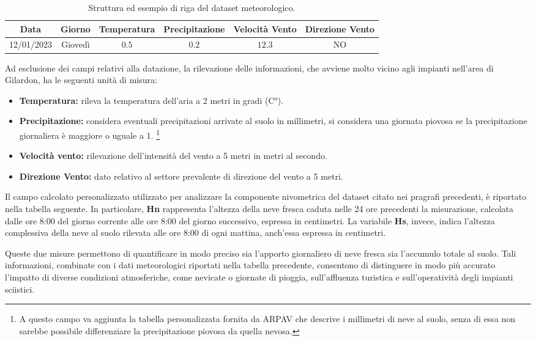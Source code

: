 \begin{table}[h]
    \centering
    \begin{tabular}{cccccc}
        \toprule
        \textbf{Data} & \textbf{Giorno} & \textbf{Temperatura}  & \textbf{Precipitazione} & \textbf{Velocità Vento} & \textbf{Direzione Vento} \\
        \midrule
        12/01/2023 & Giovedì &  $0.5$ & $0.2$ & $12.3$ & NO \\
        \bottomrule
    \end{tabular}
    \caption{Struttura ed esempio di riga del dataset meteorologico.}
    \label{tab:SpecificaMeteo}
\end{table}

Ad esclusione dei campi relativi alla datazione, la rilevazione delle informazioni, che avviene molto vicino agli impianti nell'area di Gilardon, ha le seguenti unità di misura:

\begin{itemize}
    \item \textbf{Temperatura:} rileva la temperatura dell'aria a 2 metri in gradi (C°).
    \item \textbf{Precipitazione:} considera eventuali precipitazioni arrivate al suolo in millimetri, si considera una giornata piovosa se la precipitazione giornaliera è maggiore o uguale a 1. \footnote{A questo campo va aggiunta la tabella personalizzata fornita da ARPAV che descrive i millimetri di neve al suolo, senza di essa non sarebbe possibile differenziare la precipitazione piovosa da quella nevosa.}
    \item \textbf{Velocità vento:} rilevazione dell'intensità del vento a 5 metri in metri al secondo.
    \item \textbf{Direzione Vento:} dato relativo al settore prevalente di direzione del vento a 5 metri.
\end{itemize}


Il campo calcolato personalizzato utilizzato per analizzare la componente nivometrica del dataset citato nei pragrafi precedenti,  è riportato nella tabella seguente. 
In particolare, \textbf{Hn} rappresenta l'altezza della neve fresca caduta nelle 24 ore precedenti la misurazione, calcolata dalle ore 8:00 del giorno corrente alle ore 8:00 del giorno successivo, espressa in centimetri. 
La variabile \textbf{Hs}, invece, indica l'altezza complessiva della neve al suolo rilevata alle ore 8:00 di ogni mattina, anch'essa espressa in centimetri. 

Queste due misure permettono di quantificare in modo preciso sia l'apporto giornaliero di neve fresca sia l’accumulo totale al suolo. 
Tali informazioni, combinate con i dati meteorologici riportati nella tabella precedente, consentono di distinguere in modo più accurato l’impatto di diverse condizioni atmosferiche, come nevicate o giornate di pioggia, sull'affluenza turistica e sull’operatività degli impianti sciistici.

